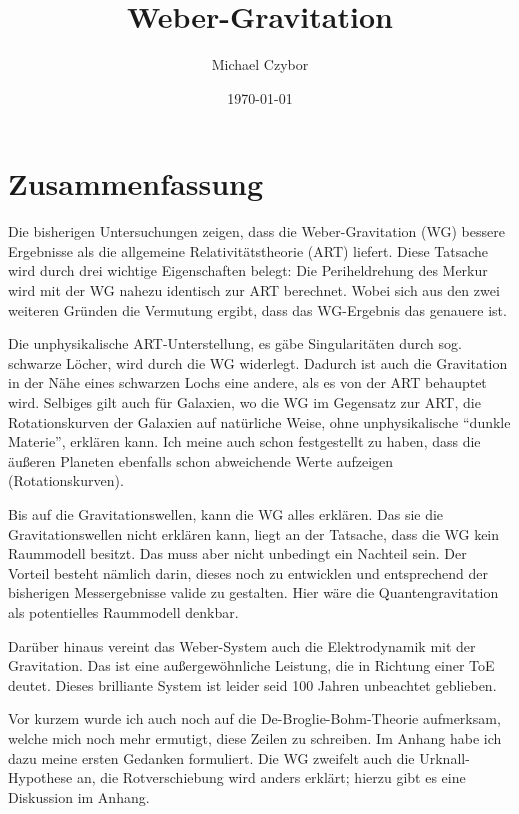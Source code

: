 \documentclass{book}
\numberwithin{equation}{section}
\begin{document}
\title{Weber-Gravitation}
\author{Michael Czybor}
\date{\today}
\maketitle

\section*{Zusammenfassung}
Die bisherigen Untersuchungen zeigen, dass die Weber-Gravitation (WG) bessere Ergebnisse als die allgemeine Relativitätstheorie (ART) liefert. Diese Tatsache wird durch drei wichtige
Eigenschaften belegt: Die Periheldrehung des Merkur wird mit der WG nahezu identisch zur ART berechnet. Wobei sich aus den zwei weiteren Gründen die Vermutung ergibt, dass das WG-Ergebnis
das genauere ist.

Die unphysikalische ART-Unterstellung, es gäbe Singularitäten durch sog. schwarze Löcher, wird durch die WG widerlegt. Dadurch ist auch die Gravitation in der Nähe eines schwarzen Lochs
eine andere, als es von der ART behauptet wird. Selbiges gilt auch für Galaxien, wo die WG im Gegensatz zur ART, die Rotationskurven der Galaxien auf natürliche Weise, ohne unphysikalische
\enquote{dunkle Materie}, erklären kann. Ich meine auch schon festgestellt zu haben, dass die äußeren Planeten ebenfalls schon abweichende Werte aufzeigen (Rotationskurven).

Bis auf die Gravitationswellen, kann die WG alles erklären. Das sie die Gravitationswellen nicht erklären kann, liegt an der Tatsache, dass die WG kein Raummodell besitzt. Das muss aber nicht
unbedingt ein Nachteil sein. Der Vorteil besteht nämlich darin, dieses noch zu entwicklen und entsprechend der bisherigen Messergebnisse valide zu gestalten. Hier wäre die Quantengravitation
als potentielles Raummodell denkbar.

Darüber hinaus vereint das Weber-System auch die Elektrodynamik mit der Gravitation. Das ist eine außergewöhnliche Leistung, die in Richtung einer ToE deutet. Dieses brilliante System ist
leider seid 100 Jahren unbeachtet geblieben.

Vor kurzem wurde ich auch noch auf die De-Broglie-Bohm-Theorie aufmerksam, welche mich noch mehr ermutigt, diese Zeilen zu schreiben. Im Anhang habe ich dazu meine ersten Gedanken formuliert.
Die WG zweifelt auch die Urknall-Hypothese an, die Rotverschiebung wird anders erklärt; hierzu gibt es eine Diskussion im Anhang.

\tableofcontents
\end{document}

